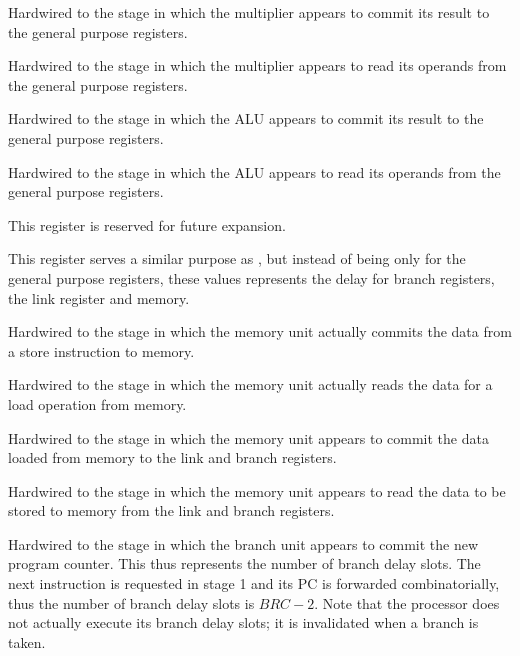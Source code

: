 \reset{****}
Hardwired to the stage in which the multiplier appears to commit its result to
the general purpose registers.

\reset{****}
Hardwired to the stage in which the multiplier appears to read its operands from
the general purpose registers.

\reset{****}
Hardwired to the stage in which the ALU appears to commit its result to the
general purpose registers.

\reset{****}
Hardwired to the stage in which the ALU appears to read its operands from the
general purpose registers.


This register is reserved for future expansion.


This register serves a similar purpose as , but instead of being only
for the general purpose registers, these values represents the delay for branch
registers, the link register and memory.

\reset{****}
Hardwired to the stage in which the memory unit actually commits the data from
a store instruction to memory.

\reset{****}
Hardwired to the stage in which the memory unit actually reads the data for a
load operation from memory.

\reset{****}
Hardwired to the stage in which the memory unit appears to commit the data
loaded from memory to the link and branch registers.

\reset{****}
Hardwired to the stage in which the memory unit appears to read the data to be
stored to memory from the link and branch registers.

\reset{****}
Hardwired to the stage in which the branch unit appears to commit the new
program counter. This thus represents the number of branch delay slots. The next
instruction is requested in stage 1 and its PC is forwarded combinatorially,
thus the number of branch delay slots is $BRC - 2$. Note that the \rvex{}
processor does not actually execute its branch delay slots; it is invalidated
when a branch is taken.

